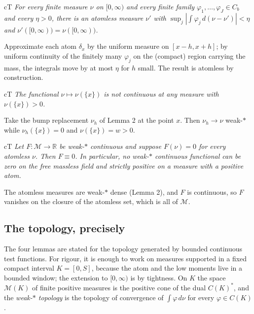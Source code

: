 \begin{claimbox}{cT}
 \emph{For every finite measure $\nu$ on
$[0,\infty)$ and every finite family $\varphi_1,\dots,\varphi_J\in C_b$ and every $\eta>0$,
there is an atomless measure $\nu'$ with $\sup_j|\int\varphi_j\,d(\nu-\nu')|<\eta$ and
$\nu'([0,\infty))=\nu([0,\infty))$.}
\begin{proofx}
Approximate each atom $\delta_{x}$ by the uniform measure on $[x-h,x+h]$; by uniform continuity
of the finitely many $\varphi_j$ on the (compact) region carrying the mass, the integrals move by
at most $\eta$ for $h$ small. The result is atomless by construction.
\end{proofx}
\end{claimbox}

\begin{claimbox}{cT}
 \emph{The functional $\nu\mapsto\nu(\{x\})$
is not continuous at any measure with $\nu(\{x\})>0$.}
\begin{proofx}
Take the bump replacement $\nu_h$ of Lemma 2 at the point $x$. Then $\nu_h\to\nu$ weak-$*$ while
$\nu_h(\{x\})=0$ and $\nu(\{x\})=w>0$.
\end{proofx}
\end{claimbox}

\begin{claimbox}{cT}
 \emph{Let $F:\mathcal M\to\mathbb R$ be
weak-$*$ continuous and suppose $F(\nu)=0$ for every atomless $\nu$. Then $F\equiv0$. In
particular, no weak-$*$ continuous functional can be zero on the free massless field and
strictly positive on a measure with a positive atom.}
\begin{proofx}
The atomless measures are weak-$*$ dense (Lemma 2), and $F$ is continuous, so $F$ vanishes on
the closure of the atomless set, which is all of $\mathcal M$.
\end{proofx}
\end{claimbox}

\subsection{The topology, precisely}
\label{sec:topology}

The four lemmas are stated for the topology generated by bounded continuous test functions. For
rigour, it is enough to work on measures supported in a fixed compact interval
$K=[0,S]$, because the atom and the low moments live in a bounded window; the extension to
$[0,\infty)$ is by tightness. On $K$ the space $\mathcal M(K)$ of finite positive measures is the
positive cone of the dual $C(K)^*$, and the \emph{weak-$*$ topology} is the topology of
convergence of $\int\varphi\,d\nu$ for every $\varphi\in C(K)$.

